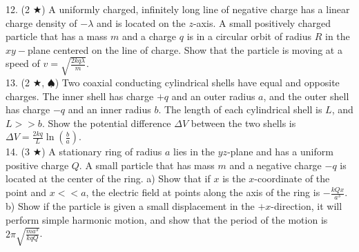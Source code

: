 12. (2 $\bigstar$) A uniformly charged, infinitely long line of negative charge has a linear charge density of $-\lambda$ and is located on the $z$-axis. A small positively charged particle that has a mass $m$ and a charge $q$ is in a circular orbit of radius $R$ in the $xy-$plane centered on the line of charge. Show that the particle is moving at a speed of $v = \sqrt{\frac{2kq\lambda}{m}}$.\\
13. (2 $\bigstar$, $\spadesuit$) Two coaxial conducting cylindrical shells have equal and opposite charges. The inner shell has charge $+q$ and an outer radius $a$, and the outer shell has charge $-q$ and an inner radius $b$. The length of each cylindrical shell is $L$, and $L >> b$. Show the potential difference $\Delta V$ between the two shells is $\Delta V = \frac{2kq}{L}\ln\left(\frac{b}{a}\right)$.\\
14. (3 $\bigstar$) A stationary ring of radius $a$ lies in the $yz$-plane and has a uniform positive charge $Q$. A small particle that has mass $m$ and a negative charge $-q$ is located at the center of the ring. a) Show that if $x$ is the $x$-coordinate of the point and $x<<a$, the electric field at points along the axis of the ring is $-\frac{kQx}{a^3}$. b) Show if the particle is given a small displacement in the $+x$-direction, it will perform simple harmonic motion, and show that the period of the motion is $2\pi \sqrt{\frac{ma^3}{kqQ}}$.
\pagebreak